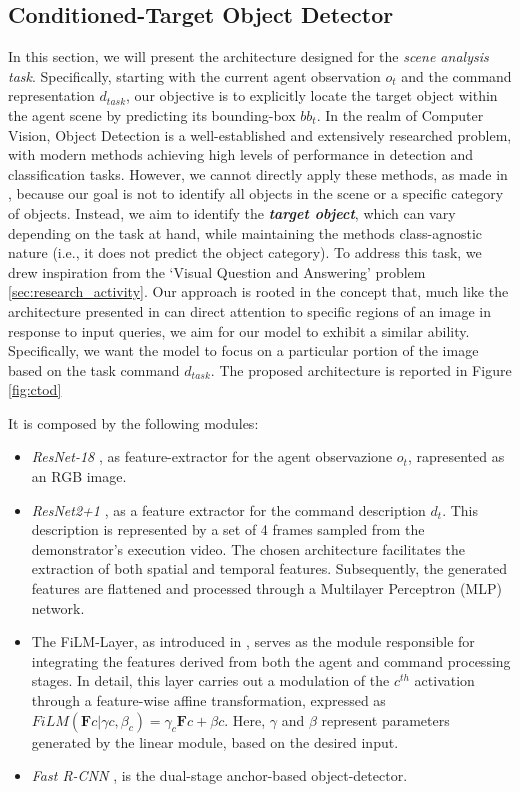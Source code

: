 \subsection{Conditioned-Target Object Detector}
\label{sec:cond_target_obj_detector}
In this section, we will present the architecture designed for the \textit{scene analysis task}. Specifically, starting with the current agent observation $o_{t}$ and the command representation $d_{task}$, our objective is to explicitly locate the target object within the agent scene by predicting its bounding-box $bb_{t}$. In the realm of Computer Vision, Object Detection is a well-established and extensively researched problem, with modern methods achieving high levels of performance in detection and classification tasks. However, we cannot directly apply these methods, as made in \cite{jiang2023vima, zhu2023viola}, because our goal is not to identify all objects in the scene or a specific category of objects. Instead, we aim to identify the \textit{\textbf{target object}}, which can vary depending on the task at hand, while maintaining the methods class-agnostic nature (i.e., it does not predict the object category).
\newline To address this task, we drew inspiration from the `Visual Question and Answering' problem \ref{sec:research_activity}. Our approach is rooted in the concept that, much like the architecture presented in \cite{perez2018film} can direct attention to specific regions of an image in response to input queries, we aim for our model to exhibit a similar ability. Specifically, we want the model to focus on a particular portion of the image based on the task command $d_{task}$.
The proposed architecture is reported in Figure \ref{fig:ctod}

It is composed by the following modules:
\begin{itemize}
    \item \textit{ResNet-18} \cite{resnet}, as feature-extractor for the agent observazione $o_{t}$, rapresented as an RGB image.
    \item \textit{ResNet2+1} \cite{resnet21},  as a feature extractor for the command description $d_{t}$. This description is represented by a set of 4 frames sampled from the demonstrator's execution video. The chosen architecture facilitates the extraction of both spatial and temporal features. Subsequently, the generated features are flattened and processed through a Multilayer Perceptron (MLP) network.
    \item The FiLM-Layer, as introduced in \cite{perez2018film}, serves as the module responsible for integrating the features derived from both the agent and command processing stages. In detail, this layer carries out a modulation of the $c^{th}$ activation through a feature-wise affine transformation, expressed as $FiLM(\textbf{F}{c}|\gamma{c}, \beta_{c}) = \gamma_{c} \textbf{F}{c} + \beta{c}$. Here, $\gamma$ and $\beta$ represent parameters generated by the linear module, based on the desired input.
    \item \textit{Fast R-CNN} \cite{fastrcnn}, is the dual-stage anchor-based object-detector.
\end{itemize}
